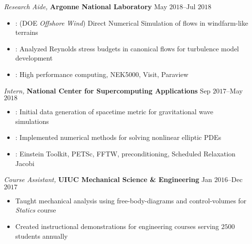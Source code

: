 \documentclass[10pt]{article}
\begin{document}
\begin{multicols}{2}
\vspace{0.5em}
%
\textit{Research Aide,} \textbf{Argonne National Laboratory} \hfill May $2018$--Jul $2018$

\vspace{-1.75em}
\begin{itemize}[label=-]
    \setlength\itemsep{-0.25em}
    \setlength{\itemindent}{-1.50em}
    \item {}: (DOE \textit{Offshore Wind}) Direct Numerical Simulation of flows in windfarm-like terrains
    \item {}: Analyzed Reynolds stress budgets in canonical flows for turbulence model development
    \item {}: High performance computing, NEK5000, Visit, Paraview
\end{itemize}
\vspace{-2.0em}

\vspace{0.5em}
%
\textit{Intern,} \textbf{National Center for Supercomputing Applications} \hfill Sep $2017$--May $2018$

\vspace{-1.75em}
\begin{itemize}[label=-]
    \setlength\itemsep{-0.25em}
    \setlength{\itemindent}{-1.50em}
    \item {}: Initial data generation of spacetime metric for gravitational wave simulations
    \item {}: Implemented numerical methods for solving nonlinear elliptic PDEs
    \item {}: {Einstein Toolkit}, {PETSc}, {FFTW}, preconditioning, {Scheduled Relaxation Jacobi}
\end{itemize}
\vspace{-2.0em}

\vspace{0.5em}
%
{\sl Course Assistant,} \textbf{UIUC Mechanical Science \& Engineering} \hfill Jan $2016$--Dec $2017$

\vspace{-1.75em}
\begin{itemize}[label=-]
    \setlength\itemsep{-0.25em}
    \setlength{\itemindent}{-1.50em}
    \item Taught mechanical analysis using free-body-diagrams and control-volumes for \textit{Statics} course
    \item Created instructional demonstrations for engineering courses serving $2500$ students annually
\end{itemize}
\vspace{-2.0em}

\end{multicols}
\end{document}

